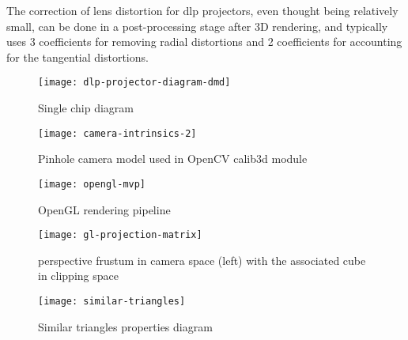 The correction of lens distortion for \gls{dlp} projectors, even thought being relatively small, can be done in a post-processing stage after 3D rendering, and typically uses 3 coefficients for removing radial distortions and 2 coefficients for accounting for the tangential distortions.


\begin{figure}[!ht]
	\centering
	\texttt{[image: dlp-projector-diagram-dmd]}
	\caption[Single chip  diagram]{Single chip  diagram\protect\footnotemark}
	\label{fig:dlp-projector-diagram-dmd}
\end{figure}

\begin{figure}[!ht]
	\centering
	\texttt{[image: camera-intrinsics-2]}
	\caption[Pinhole camera model used in OpenCV calib3d module]{Pinhole camera model used in OpenCV calib3d module\protect\footnotemark}
	\label{fig:camera-intrinsics}
\end{figure}

\begin{figure}[!ht]
	\centering
	\texttt{[image: opengl-mvp]}
	\caption[OpenGL rendering pipeline]{OpenGL rendering pipeline\protect\footnotemark}
	\label{fig:opengl-mvp}
\end{figure}

\begin{figure}[!ht]
	\centering
	\texttt{[image: gl-projection-matrix]}
	\caption[{ perspective frustum in camera space (left) with the associated  cube in clipping space}]{{ perspective frustum in camera space (left) with the associated  cube in clipping space}\protect\footnotemark}
	\label{fig:ndc}
\end{figure}

\begin{figure}[!ht]
	\centering
	\texttt{[image: similar-triangles]}
	\caption[Similar triangles properties diagram]{Similar triangles properties diagram\protect\footnotemark}
	\label{fig:similar-triangles}
\end{figure}



